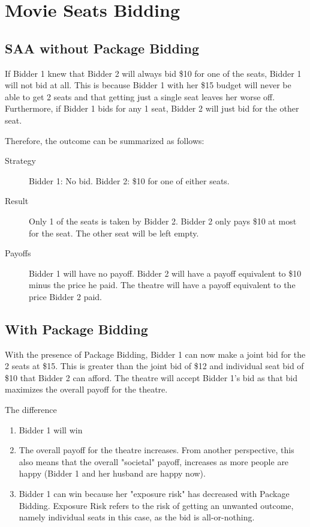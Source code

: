 \documentclass[]{article}
\begin{document}
\newpage
\section{Movie Seats Bidding}
\subsection{SAA without Package Bidding}

If Bidder 1 knew that Bidder 2 will always bid \$10 for one of the seats, Bidder 1 will not bid at all. This is because Bidder 1 with her \$15 budget will never be able to get 2 seats and that getting just a single seat leaves her worse off. Furthermore, if Bidder 1 bids for any 1 seat, Bidder 2 will just bid for the other seat.

Therefore, the outcome can be summarized as follows:
\begin{description}
	\item[Strategy] Bidder 1: No bid. Bidder 2: \$10 for one of either seats.
	\item[Result] Only 1 of the seats is taken by Bidder 2. Bidder 2 only pays \$10 at most for the seat. The other seat will be left empty. 
	\item[Payoffs] Bidder 1 will have no payoff. Bidder 2 will have a payoff equivalent to \$10 minus the price he paid. The theatre will have a payoff equivalent to the price Bidder 2 paid.
\end{description}

\subsection{With Package Bidding}

With the presence of Package Bidding, Bidder 1 can now make a joint bid for the 2 seats at \$15. This is greater than the joint bid of \$12 and individual seat bid of \$10 that Bidder 2 can afford. The theatre will accept Bidder 1's bid as that bid maximizes the overall payoff for the theatre. 

The difference
\begin{enumerate}
	\item Bidder 1 will win
	\item The overall payoff for the theatre increases. From another perspective, this also means that the overall "societal" payoff, increases as more people are happy (Bidder 1 and her husband are happy now).
	\item Bidder 1 can win because her "exposure risk" has decreased with Package Bidding. Exposure Risk refers to the risk of getting an unwanted outcome, namely individual seats in this case, as the bid is all-or-nothing.
\end{enumerate}
\end{document}
